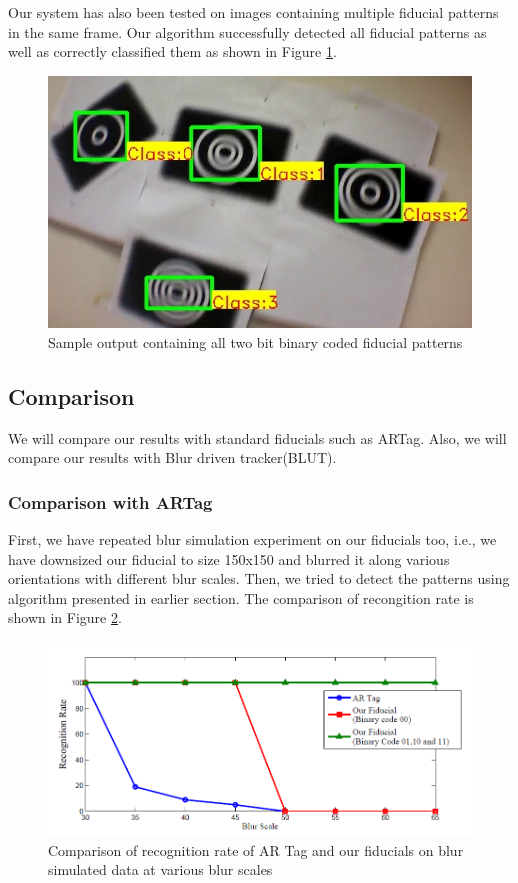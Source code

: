 \documentclass[runningheads]{llncs}
\begin{document}
Our system has also been tested on images containing multiple fiducial patterns
in the same frame. Our algorithm successfully detected all fiducial patterns as
well as correctly classified them as shown in Figure \ref{fig:output_all}.
\begin{figure}
\centering
  \includegraphics[width=.8\linewidth]{output_all_2.jpg}
  \caption{Sample output containing all two bit binary coded fiducial patterns}
  \label{fig:output_all}
\end{figure}

\subsection{Comparison}
We will compare our results with standard fiducials such as ARTag. Also, we will
compare our results with Blur driven tracker(BLUT)\cite{Wu:2011}.
\subsubsection{Comparison with ARTag}
First, we have repeated blur simulation experiment on our fiducials too, i.e.,
we have downsized our fiducial to size 150x150 and blurred it along various
orientations with different blur scales. Then, we tried to detect the patterns
using algorithm presented in earlier section. The comparison of recongition
rate is shown in Figure \ref{fig:recognition_rate}.

\begin{figure}
\centering
\includegraphics[width=\linewidth]{recognition_rate.png}
\caption{Comparison of recognition rate of AR Tag and our fiducials on
blur simulated data at various blur scales}
\label{fig:recognition_rate}
\end{figure}
\end{document}
